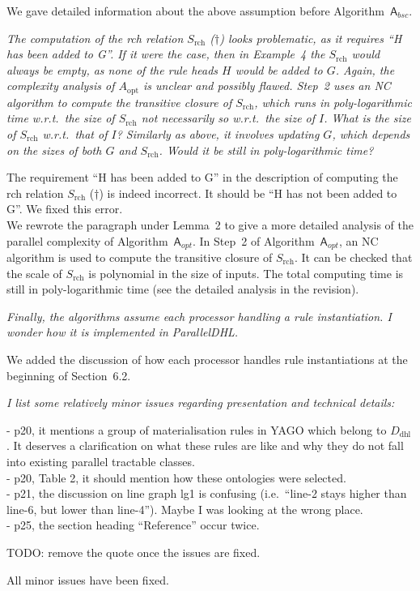 \documentclass{article}
\let\quoteOld\quote
\let\endquoteOld\endquote
\renewenvironment{quote}{\quoteOld\itshape}{\endquoteOld}
\begin{document}
We gave detailed information about the above assumption before Algorithm~$\mathsf{A}_{bsc}$.


\begin{quote}
The computation of the rch relation $S_{\text{rch}}$ ($\dag$) looks problematic, as it requires ``H has been added to G''. If it were the case, then in Example~4 the $S_{\text{rch}}$ would always be empty, as none of the rule heads $H$ would be added to $G$. Again, the complexity analysis of $A_{\text{opt}}$ is unclear and possibly flawed. Step~2 uses an NC algorithm to compute the transitive closure of $S_{\text{rch}}$, which runs in poly-logarithmic time w.r.t.\ the size of $S_{\text{rch}}$ not necessarily so w.r.t.\ the size of $I$. What is the size of $S_{\text{rch}}$ w.r.t.\ that of $I$? Similarly as above, it involves updating $G$, which depends on the sizes of both $G$ and $S_{\text{rch}}$. Would it be still in poly-logarithmic time?
\end{quote}

The requirement ``H has been added to G'' in the description of computing the rch relation $S_{\text{rch}}$ ($\dag$) is indeed
incorrect. It should be ``H has not been added to G''. We fixed this error.\\

We rewrote the paragraph under Lemma~2 to give a more detailed
analysis of the parallel complexity of Algorithm~$\mathsf{A}_{opt}$.
In Step~2 of Algorithm~$\mathsf{A}_{opt}$, an NC algorithm is used to compute the transitive closure of $S_{\text{rch}}$.
It can be checked that the scale of $S_{\text{rch}}$ is polynomial in the size of inputs.
The total computing time is still in poly-logarithmic time (see the detailed analysis in the revision).


\begin{quote}
Finally, the algorithms assume each processor handling a rule instantiation. I wonder how it is implemented in ParallelDHL.
\end{quote}

We added the discussion of how each processor handles rule instantiations at the beginning of Section~6.2.

\begin{quote}
I list some relatively minor issues regarding presentation and technical details:

- p20, it mentions a group of materialisation rules in YAGO which belong to $D_{\text{dhl}}$. It deserves a clarification on what these rules are like and why they do not fall into existing parallel tractable classes.\\
- p20, Table 2, it should mention how these ontologies were selected. \\
- p21, the discussion on line graph lg1 is confusing (i.e.\ ``line-2 stays higher than line-6, but lower than line-4''). Maybe I was looking at the wrong place. \\
- p25, the section heading ``Reference'' occur twice.
\end{quote}

TODO: remove the quote once the issues are fixed.

All minor issues have been fixed.




\end{document}
